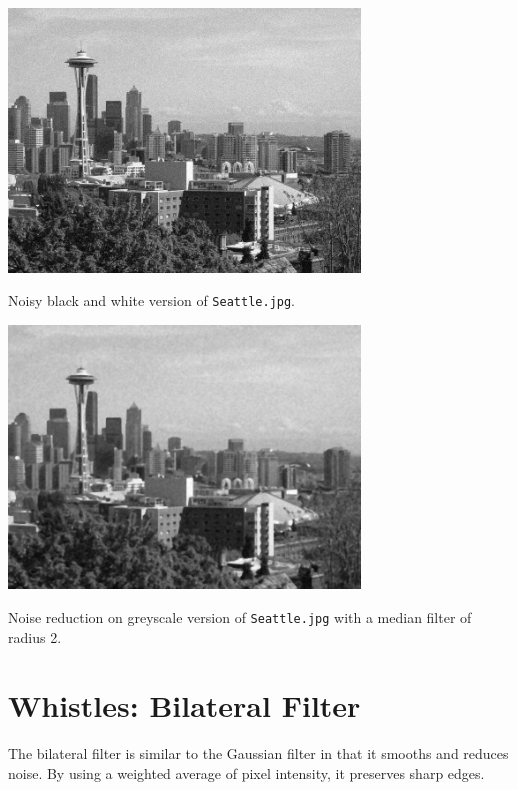 \documentclass[letterpaper]{article}
\begin{document}
\begin{center}
  \includegraphics[width=0.7\textwidth]{mediantasknoise.png}

  Noisy black and white version of \texttt{Seattle.jpg}.
  
  \includegraphics[width=0.7\textwidth]{mediantask.png}
  
  Noise reduction on greyscale version of \texttt{Seattle.jpg} with a median
  filter of radius 2.
\end{center}

\section*{Whistles: Bilateral Filter}

The bilateral filter is similar to the Gaussian filter in that it smooths and
reduces noise. By using a weighted average of pixel intensity, it preserves
sharp edges.
\end{document}
